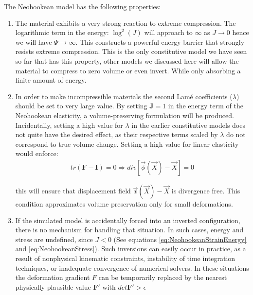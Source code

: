 The Neohookean model has the following properties:

\begin{enumerate}
 \item The material exhibits a very strong reaction to extreme compression. The logarithmic term in the energy: $\log^2(J)$ will approach 
 to $\infty$ as $J \rightarrow 0$ hence we will have $\Psi \rightarrow \infty$. This constructs a powerful energy barrier that strongly
 resists extreme compression. This is the only constitutive model we have seen so far that has this property, other models we discussed here
 will allow the material to compress to zero volume or even invert. While only absorbing a finite amount of energy.
 
 \item In order to make incompressible materials the second Lam\'e coefficients ($\lambda$) should be set to very large value. By setting 
 $\boldsymbol{J}=1$ in the energy term of the Neohookean elasticity, a volume-preserving formulation will be produced. Incidentally, setting a
 high value for $\lambda$ in the earlier constitutive models does not quite have the desired effect, as their respective terms scaled by $\lambda$
 do not correspond to true volume change. Setting a high value for linear elasticity would enforce:
\begin{gather*}
  tr(\boldsymbol{F}-\boldsymbol{I})=0 \Rightarrow div\left[\vec{\phi}(\vec{X})-\vec{X}\right] = 0
\end{gather*}

this will ensure that displacement field $\vec{x}(\vec{X})-\vec{X}$ is divergence free. This condition approximates volume preservation only
for small deformations.

\item If the simulated model is accidentally forced into an inverted configuration, there is no mechanism for handling that situation.  
In such cases, energy and stress are undefined, since $J <0$ (See equations \ref{eq:NeohookeanStrainEnergy} and \ref{eq:NeohookeanStress}).
Such inversions can easily occur in practice, as a result of nonphysical kinematic constraints, instability of time integration techniques,
or inadequate convergence of numerical solvers. In these situations the deformation gradient $F$ can be temporarily replaced by the nearest
physically plausible value $\boldsymbol{F'}$ with $det\boldsymbol{F'} > \epsilon$
\end{enumerate}

























\setlength{\unitlength}{\savedunitlength}
